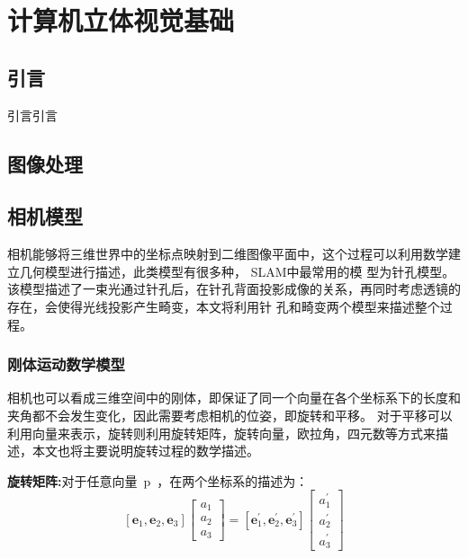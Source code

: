 \chapter{计算机立体视觉基础}
\label{cha:chapVSLAM}
\section{引言}
\label{sec:chapVSLAM.1}
引言引言
\section{图像处理}
\section{相机模型}
相机能够将三维世界中的坐标点映射到二维图像平面中，这个过程可以利用数学建立几何模型进行描述，此类模型有很多种， SLAM中最常用的模
型为针孔模型。该模型描述了一束光通过针孔后，在针孔背面投影成像的关系，再同时考虑透镜的存在，会使得光线投影产生畸变，本文将利用针
孔和畸变两个模型来描述整个过程。
\subsection{刚体运动数学模型}
相机也可以看成三维空间中的刚体，即保证了同一个向量在各个坐标系下的长度和夹角都不会发生变化，因此需要考虑相机的位姿，即旋转和平移。
对于平移可以利用向量来表示，旋转则利用旋转矩阵，旋转向量，欧拉角，四元数等方式来描述，本文也将主要说明旋转过程的数学描述。

\textbf{旋转矩阵:}对于任意向量{~p~}，在两个坐标系的描述为：
\begin{equation}
  \left[\mathbf{e}_{1}, \mathbf{e}_{2}, \mathbf{e}_{3}\right]\left[\begin{array}{l}{a_{1}} \\ {a_{2}} \\ {a_{3}}\end{array}\right]=\left[\mathbf{e}_{1}^{\prime}, \mathbf{e}_{2}^{\prime}, \mathbf{e}_{3}^{\prime}\right]\left[\begin{array}{c}{a_{1}^{\prime}} \\ {a_{2}^{\prime}} \\ {a_{3}^{\prime}}\end{array}\right]
\end{equation}

